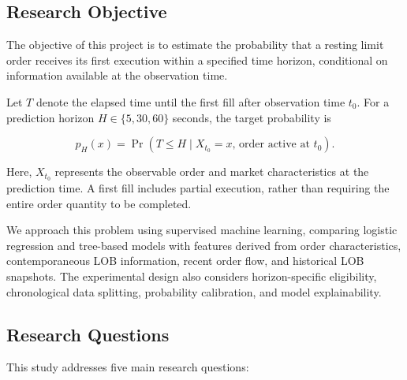 \documentclass[11pt,a4paper]{article}
\begin{document}
\subsection{Research Objective}

The objective of this project is to estimate the probability
that a resting limit order receives its first execution
within a specified time horizon, conditional on information
available at the observation time.

Let $T$ denote the elapsed time until the first fill after
observation time $t_0$. For a prediction horizon
$H \in \{5,30,60\}$ seconds, the target probability is

\begin{equation}
	p_H(x) =
	\Pr\left(
	T \leq H \mid X_{t_0}=x,\,
	\text{order active at }t_0
	\right).
	\label{eq:fill_probability}
\end{equation}

Here, $X_{t_0}$ represents the observable order and market
characteristics at the prediction time. A first fill
includes partial execution, rather than requiring the
entire order quantity to be completed.

We approach this problem using supervised machine learning,
comparing logistic regression and tree-based models with
features derived from order characteristics, contemporaneous
LOB information, recent order flow, and historical LOB
snapshots. The experimental design also considers
horizon-specific eligibility, chronological data splitting,
probability calibration, and model explainability.

\subsection{Research Questions}

This study addresses five main research questions:
\end{document}
